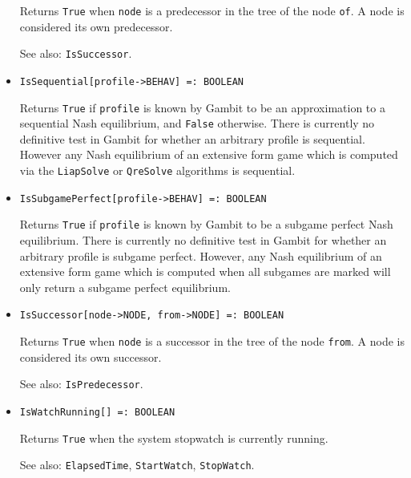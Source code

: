 \begin{itemize}
\bd
Returns \verb+True+ when \verb+node+ is a predecessor
in the tree of the node \verb+of+.  A node is considered its own predecessor.
\item [See also:] \verb+IsSuccessor+.
\ed

\item{}
\protect \large \begin{verbatim}
IsSequential[profile->BEHAV] =: BOOLEAN 
\end{verbatim}\normalsize

\bd 
{}
Returns \verb+True+ if \verb+profile+
is known by Gambit to be an approximation to a
sequential Nash equilibrium, and \verb+False+ otherwise.  There is
currently no definitive test in Gambit for whether an arbitrary
profile is sequential.  However any Nash equilibrium of an extensive
form game which is computed via the \verb+LiapSolve+ or
\verb+QreSolve+ algorithms is sequential.
\ed

\item{}
\protect \large \begin{verbatim}
IsSubgamePerfect[profile->BEHAV] =: BOOLEAN 
\end{verbatim}\normalsize

\bd
{}
Returns \verb+True+ if \verb+profile+
is known by Gambit to be a subgame perfect Nash
equilibrium.  There is currently no
definitive test in Gambit for whether an arbitrary profile is subgame
perfect.  However, any Nash equilibrium of an extensive form game which
is computed when all subgames are marked will only return a subgame
perfect equilibrium.  
\ed

\item{}
\protect \large \begin{verbatim}
IsSuccessor[node->NODE, from->NODE] =: BOOLEAN 
\end{verbatim}\normalsize

\bd
Returns \verb+True+ when \verb+node+ is a successor
in the tree of the node \verb+from+.  A node is considered its own successor.
\item [See also:] \verb+IsPredecessor+.
\ed

\item{}
\protect \large \begin{verbatim}
IsWatchRunning[] =: BOOLEAN 
\end{verbatim}\normalsize

\bd
Returns \verb+True+ when the system stopwatch is currently running.
\item
[See also:] \verb+ElapsedTime+, \verb+StartWatch+, \verb+StopWatch+.
\ed



\end{itemize}
